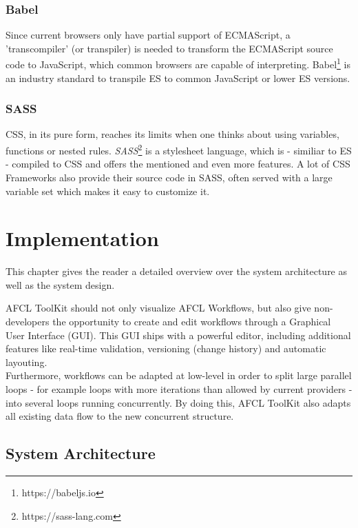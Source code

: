 \documentclass[a4paper,12pt,pdftex,halfparskip,cleardoubleempty,bibtotoc,liststotoc]{scrbook}
\begin{document}
\subsection{Babel}
Since current browsers only have partial support of ECMAScript, a 'transcompiler' (or transpiler) is needed to transform the ECMAScript source code to JavaScript, which common browsers are capable of interpreting.
Babel\footnote{https://babeljs.io} is an industry standard to transpile ES to common JavaScript or lower ES versions.

\subsection{SASS}

CSS, in its pure form, reaches its limits when one thinks about using variables, functions or nested rules. \textit{SASS}\footnote{https://sass-lang.com} is a stylesheet language, which is - similiar to ES - compiled to CSS and offers the mentioned and even more features.
A lot of CSS Frameworks also provide their source code in SASS, often served with a large variable set which makes it easy to customize it.

\chapter{Implementation}

This chapter gives the reader a detailed overview over the system architecture as well as the system design.

AFCL ToolKit should not only visualize AFCL Workflows, but also give non-developers the opportunity to create and edit workflows through a Graphical User Interface (GUI). This GUI ships with a powerful editor, including additional features like real-time validation, versioning (change history) and automatic layouting.\\
Furthermore, workflows can be adapted at low-level in order to split large parallel loops - for example loops with more iterations than allowed by current providers - into several loops running concurrently. By doing this, AFCL ToolKit also adapts  all existing data flow to the new concurrent structure.

\section{System Architecture}

\end{document}
